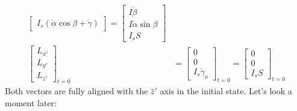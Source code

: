 \documentclass[10pt]{article}
\begin{document}
\begin{align*}
\begin{bmatrix}
        I_s(\dot\alpha\cos\beta+\dot\gamma)
    \end{bmatrix}
    =
    \begin{bmatrix}
        I\dot\beta \\
        I\dot\alpha\sin\beta \\
        I_sS
    \end{bmatrix}
    \\
    \begin{bmatrix}
        L_{x'} \\
        L_{y'} \\
        L_{z'}
    \end{bmatrix}_{t=0}
    &=
    \begin{bmatrix}
        0 \\
        0 \\
        I_s\dot\gamma_o
    \end{bmatrix}_{t=0}
    =
    \begin{bmatrix}
        0 \\
        0 \\
        I_sS
    \end{bmatrix}_{t=0}
\end{align*}
Both vectors are fully aligned with the $\hat{z}'$ axis in the initial state. 
Let's look a moment later:
\end{document}
